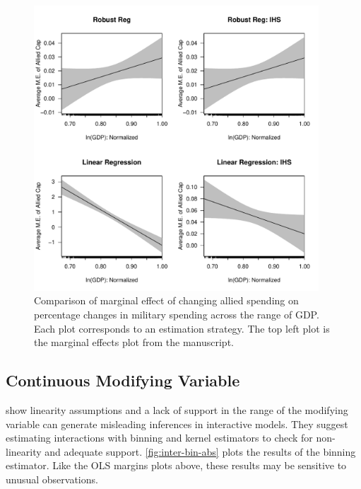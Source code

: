 \documentclass[12pt]{article}
\begin{document}
\begin{figure}[htbp]
	\centering
		\includegraphics[width=0.95\textwidth]{me-plots.pdf}
	\caption{Comparison of marginal effect of changing allied spending on percentage changes in military spending across the range of GDP. Each plot corresponds to an estimation strategy. The top left plot is the marginal effects plot from the manuscript.}
	\label{fig:me-plots}
\end{figure}



\subsection{Continuous Modifying Variable}


\citet{Hainmuelleretal2019} show linearity assumptions and a lack of support in the range of the modifying variable can generate misleading inferences in interactive models. 
They suggest estimating interactions with binning and kernel estimators to check for non-linearity and adequate support. 
\autoref{fig:inter-bin-abs} plots the results of the binning estimator. 
Like the OLS margins plots above, these results may be sensitive to unusual observations. 
\end{document}
